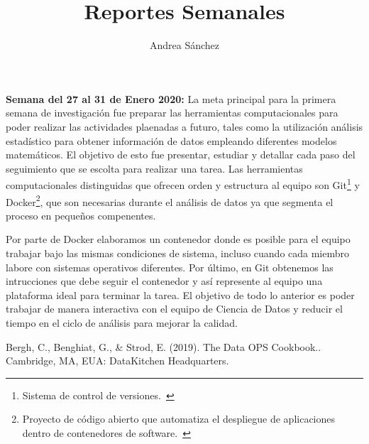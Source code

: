 \documentclass{article}
\title{Reportes Semanales}
\author{Andrea Sánchez}
\begin{document}
\maketitle
    \textbf{Semana del 27 al 31 de Enero 2020:}\newline 
    La meta principal para la primera semana de investigación fue preparar las herramientas computacionales para poder realizar las actividades plaenadas a futuro, tales como la utilización análisis estadístico para obtener información de datos empleando diferentes modelos matemáticos.
    El objetivo de esto fue presentar, estudiar y detallar cada paso del seguimiento que se escolta para realizar una tarea. Las herramientas computacionales distinguidas que ofrecen orden y estructura al equipo son Git\footnote{Sistema de control de versiones.~\cite{bergh2019}} y Docker\footnote{Proyecto de código abierto que automatiza el despliegue de aplicaciones dentro de contenedores de software.~\cite{bergh2019}}, que son necesarias durante el análisis de datos ya que segmenta el proceso en pequeños compenentes.

    Por parte de Docker elaboramos un contenedor donde es posible para el equipo trabajar bajo las mismas condiciones de sistema, incluso cuando cada miembro labore con sistemas operativos diferentes. Por último, en Git obtenemos las intrucciones que debe seguir el contenedor y así represente al equipo una plataforma ideal para terminar la tarea. El objetivo de todo lo anterior es poder trabajar de manera interactiva con el equipo de Ciencia de Datos y reducir el tiempo en el ciclo de análisis para mejorar la calidad.


\begin{thebibliography}{1} 
 Bergh, C., Benghiat, G., \& Strod, E. (2019). The Data OPS Cookbook.. Cambridge, MA, EUA: DataKitchen Headquarters.
\end{thebibliography}
\end{document}
